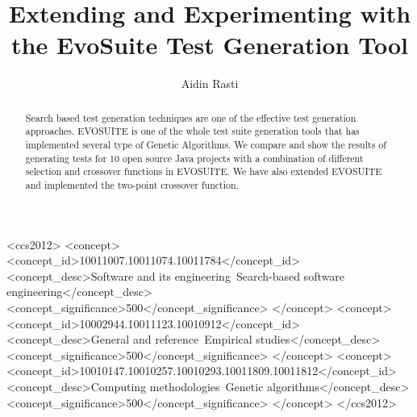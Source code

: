 \documentclass[sigconf]{acmart}
\begin{document}
\title{Extending and Experimenting with the EvoSuite Test Generation Tool}

\author{Aidin Rasti}

\renewcommand{\shortauthors}{Aidin}

\begin{abstract}
  Search based test generation techniques are one of the effective test generation approaches. 
  EVOSUITE is one of the whole test suite generation tools that has implemented several 
  type of Genetic Algorithms. We compare and show the results of generating tests for 10 open source 
  Java projects with a combination of different selection and crossover functions in EVOSUITE. 
  We have also extended EVOSUITE and implemented the two-point crossover function.
 

\end{abstract}


\begin{CCSXML}
<ccs2012>
   <concept>
       <concept_id>10011007.10011074.10011784</concept_id>
       <concept_desc>Software and its engineering~Search-based software engineering</concept_desc>
       <concept_significance>500</concept_significance>
       </concept>
   <concept>
       <concept_id>10002944.10011123.10010912</concept_id>
       <concept_desc>General and reference~Empirical studies</concept_desc>
       <concept_significance>500</concept_significance>
       </concept>
   <concept>
       <concept_id>10010147.10010257.10010293.10011809.10011812</concept_id>
       <concept_desc>Computing methodologies~Genetic algorithms</concept_desc>
       <concept_significance>500</concept_significance>
       </concept>
 </ccs2012>
\end{CCSXML}
\end{document}
